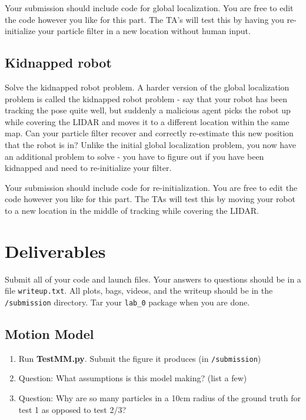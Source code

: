 \documentclass[final]{article}
\newcommand{\code}[1]{\texttt{#1}}
\begin{document}
Your submission should include code for global localization. You are free to edit the code however you like for this part. The TA’s will test this by having you re-initialize your particle filter in a new location without human input.

\subsection{Kidnapped robot}
Solve the kidnapped robot problem. A harder version of the global localization problem is called the kidnapped robot problem - say that your robot has been tracking the pose quite well, but suddenly a malicious agent picks the robot up while covering the LIDAR and moves it to a different location within the same map. Can your particle filter recover and correctly re-estimate this new position that the robot is in? Unlike the initial global localization problem, you now have an additional problem to solve - you have to figure out if you have been kidnapped and need to re-initialize your filter. 

Your submission should include code for re-initialization. You are free to edit the code however you like for this part. The TAs will test this by moving your robot to a new location in the middle of tracking while covering the LIDAR.

\section{Deliverables}
Submit all of your code and launch files. Your answers to questions should be in a file \code{writeup.txt}. All plots, bags, videos, and the writeup should be in the \code{/submission} directory. Tar your \code{lab\_0} package when you are done.

\subsection{Motion Model}
\begin{enumerate}
\item Run \textbf{TestMM.py}. Submit the figure it produces (in \code{/submission})
\item Question: What assumptions is this model making? (list a few)
\item Question: Why are so many particles in a 10cm radius of the ground truth for test 1 as opposed to test 2/3?
\end{enumerate}
\end{document}
